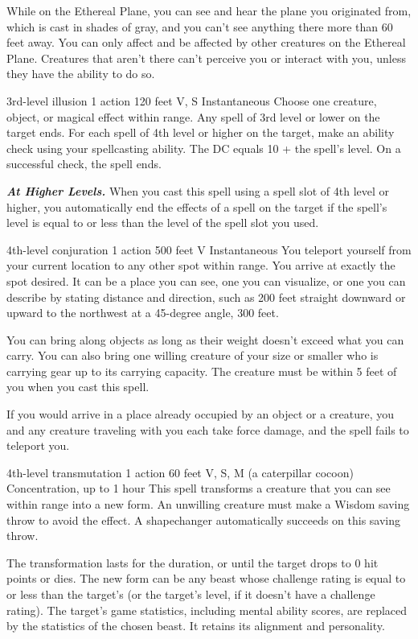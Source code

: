 \documentclass[10pt,twoside,twocolumn,openany]{book}
\newcommand\impact[1]{
	\textbf{\textit{#1}}
}
\begin{document}
While on the Ethereal Plane, you can see and hear the plane you originated from, which is cast in shades of gray, and you can't see anything there more than 60 feet away. You can only affect and be affected by other creatures on the Ethereal Plane. Creatures that aren't there can't perceive you or interact with you, unless they have the ability to do so.

{3rd-level illusion}
{\color{action} 1 action}
{120 feet}
{V, S}
{Instantaneous}
%
Choose one creature, object, or magical effect within range. Any spell of 3rd level or lower on the target ends. For each spell of 4th level or higher on the target, make an ability check using your spellcasting ability. The DC equals 10 + the spell's level. On a successful check, the spell ends.

\impact{At Higher Levels.} When you cast this spell using a spell slot of 4th level or higher, you automatically end the effects of a spell on the target if the spell's level is equal to or less than the level of the spell slot you used.

{4th-level conjuration}
{\color{action} 1 action}
{500 feet}
{V}
{Instantaneous}
%
You teleport yourself from your current location to any other spot within range. You arrive at exactly the spot desired. It can be a place you can see, one you can visualize, or one you can describe by stating distance and direction, such as 200 feet straight downward or upward to the northwest at a 45-degree angle, 300 feet.

You can bring along objects as long as their weight doesn't exceed what you can carry. You can also bring one willing creature of your size or smaller who is carrying gear up to its carrying capacity. The creature must be within 5 feet of you when you cast this spell.

If you would arrive in a place already occupied by an object or a creature, you and any creature traveling with you each take  force damage, and the spell fails to teleport you.

{4th-level transmutation}
{\color{action} 1 action}
{60 feet}
{V, S, M (a caterpillar cocoon)}
{{\color{concentration}Concentration}, up to 1 hour}
%
This spell transforms a creature that you can see within range into a new form. An unwilling creature must make a Wisdom saving throw to avoid the effect. A shapechanger automatically succeeds on this saving throw.

The transformation lasts for the duration, or until the target drops to 0 hit points or dies. The new form can be any beast whose challenge rating is equal to or less than the target's (or the target's level, if it doesn't have a challenge rating). The target's game statistics, including mental ability scores, are replaced by the statistics of the chosen beast. It retains its alignment and personality.
\end{document}
